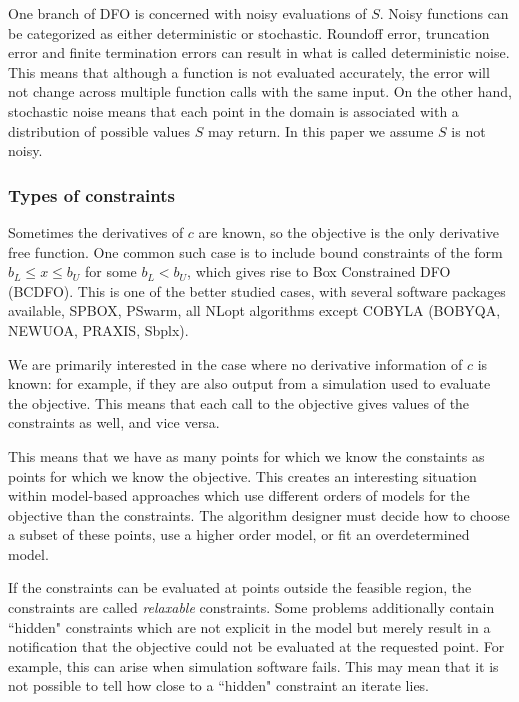 \documentclass{article}
\begin{document}
One branch of DFO is concerned with noisy evaluations of $S$.
Noisy functions can be categorized as either deterministic or stochastic.
Roundoff error, truncation error and finite termination errors can result in what is called deterministic noise.
This means that although a function is not evaluated accurately, the error will not change across multiple function calls with the same input.
On the other hand, stochastic noise means that each point in the domain is associated with a distribution of possible values $S$ may return.
In this paper we assume $S$ is not noisy.

\subsubsection{Types of constraints}

Sometimes the derivatives of $c$ are known, so the objective is the only derivative free function.
One common such case is to include bound constraints of the form $b_{L} \le x \le b_{U}$ for some $b_{L} < b_{U}$, which gives rise to Box Constrained DFO (BCDFO).
This is one of the better studied cases, with several software packages available, SPBOX, PSwarm, all NLopt algorithms except COBYLA (BOBYQA, NEWUOA, PRAXIS, Sbplx).


We are primarily interested in the case where no derivative information of $c$ is known: for example, if they are also output from a simulation used to evaluate the objective.
This means that each call to the objective gives values of the constraints as well, and vice versa.

This means that we have as many points for which we know the constaints as points for which we know the objective.
This creates an interesting situation within model-based approaches which use different orders of models for the objective than the constraints.
The algorithm designer must decide how to choose a subset of these points, use a higher order model, or fit an overdetermined model.

If the constraints can be evaluated at points outside the feasible region, the constraints are called \emph{relaxable} constraints.
Some problems additionally contain ``hidden" constraints which are not explicit in the model but merely result in a notification that the objective could not be evaluated at the requested point.
For example, this can arise when simulation software fails.
This may mean that it is not possible to tell how close to a ``hidden" constraint an iterate lies.
\end{document}
